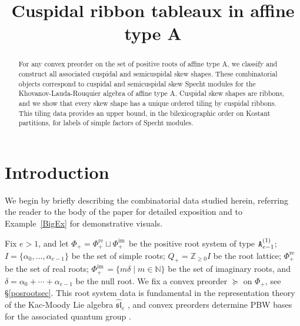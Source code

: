 \documentclass[Unicode,ALCO]{cedram}
\title
[Cuspidal ribbon tableaux in affine type A]
{Cuspidal ribbon tableaux in affine type A}
\author[\initial{D.} Abbasian]{\firstname{Dina} \lastname{Abbasian}}
\author[\initial{L.}  Difulvio]{\firstname{Lena}  \lastname{Difulvio}}
\author[\initial{R.}  Muth]{\firstname{Robert}  \lastname{Muth}}
\author[\initial{G.}  Pasternak]{\firstname{Gabrielle}  \lastname{Pasternak}}
\author[\initial{I.}  Sholtes]{\firstname{Isabella}  \lastname{Sholtes}}
\author[\initial{F.}  Sinclair]{\firstname{Frances}  \lastname{Sinclair}}
\newcommand{\im}{\operatorname{im}}
\newcommand{\0}{{\bar 0}}
\newcommand{\ZZ}{{\mathbb Z}}
\newcommand{\NN}{{\mathbb N}}
\def\re{{\mathrm{re}}}
\def\im{{\mathrm{im}\,}}
\begin{document}
\newtheorem{introtheorem}{Theorem}
\renewcommand*{\theintrotheorem}{\Alph{introtheorem}}



\begin{abstract}
For any convex preorder on the set of positive roots of affine type A, we classify and construct all associated cuspidal and semicuspidal skew shapes. These combinatorial objects correspond to cuspidal and semicuspidal skew Specht modules for the Khovanov-Lauda-Rouquier algebra of affine type A. Cuspidal skew shapes are ribbons, and we show that every skew shape has a unique ordered tiling by cuspidal ribbons. This tiling data provides an upper bound, in the bilexicographic order on Kostant partitions, for labels of simple factors of Specht modules.
\end{abstract}


\maketitle


\noindent



\section{Introduction}

We begin by briefly describing the combinatorial data studied herein, referring the reader to the body of the paper for detailed exposition and to Example~\ref{BigEx} for demonstrative visuals.

Fix \(e > 1\), and let \(\Phi_+ = \Phi_+^\re \sqcup \Phi_+^\im\) be the positive root system of type \({\tt A}^{(1)}_{e-1}\); \(I = \{\alpha_0, \ldots, \alpha_{e-1}\}\) be the set of simple roots; \(Q_+ = \ZZ_{\geq 0}I\) be the root lattice;  \(\Phi_+^\re\) be the set of real roots; \(\Phi_+^\im = \{m \delta \mid m \in \NN\}\) be the set of imaginary roots, and \(\delta = \alpha_0 + \cdots + \alpha_{e-1}\) be the null root. We fix a convex preorder \(\succeq\) on \(\Phi_+\), see \S\ref{posrootsec}. This root system data is fundamental in the representation theory of the Kac-Moody Lie algebra \(\widehat{\mathfrak{sl}}_e\) \cite{KacBookInfLie}, and convex preorders determine PBW bases for the associated quantum group \cite{BeckConBas}.
\end{document}

